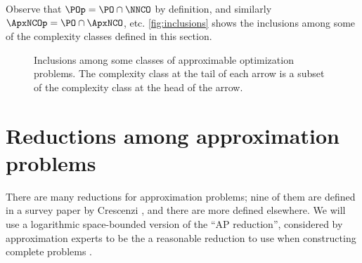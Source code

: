\documentclass[]{article}
\theoremstyle{plain}
\theoremstyle{definition}
\begin{document}
Observe that $\POp = \PO \cap \NNCO$ by definition, and similarly $\ApxNCOp = \PO \cap \ApxNCO$, etc.
\autoref{fig:inclusions} shows the inclusions among some of the complexity classes defined in this section.
\begin{figure}
  \caption{%
    Inclusions among some classes of approximable optimization problems.
    The complexity class at the tail of each arrow is a subset of the complexity class at the head of the arrow.
    \label{fig:inclusions}}
  \begin{center}
  \end{center}
\end{figure}

\section{Reductions among approximation problems}

There are many reductions for approximation problems; nine of them are defined in a survey paper by Crescenzi \cite{crescenzi97}, and there are more defined elsewhere.
We will use a logarithmic space-bounded version of the ``AP reduction'', considered by approximation experts to be the a reasonable reduction to use when constructing complete problems \cite[Section~2]{crescenzi97} \cite[Section~8.6]{acgkmp99}.
\end{document}
